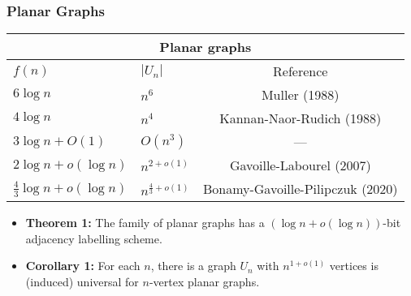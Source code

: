 \documentclass[xcolor=dvipsnames]{beamer}
\begin{document}
\begin{frame}
    \frametitle{Planar Graphs}
    \begin{center}
        \begin{tabular}{llc} \hline
            \multicolumn{3}{|c|}{Planar graphs} \\ \hline
            $f(n)$ & $|U_n|$ & Reference \\ %
            {$6\log n$} & $n^6$ & Muller (1988) \\ %
            {$4\log n$} & $n^4$ & Kannan-Naor-Rudich (1988) \\ %
            {$3\log n + O(1)$} & $O(n^3)$ & ---  \\ %
            {$2\log n + o(\log n)$} & $n^{2+o(1)}$ & Gavoille-Labourel (2007) \\ %
            {$\tfrac{4}{3}\log n + o(\log n)$} & $n^{\tfrac{4}{3}+o(1)}$ & Bonamy-Gavoille-Pilipczuk (2020) %
        \end{tabular}
    \end{center}
    \begin{itemize}
        \item<7-> {\textbf{Theorem 1:}} The family of planar graphs has a $(\log n + o(\log n))$-bit adjacency labelling scheme.

        \item<8-> \textbf{Corollary 1:} For each $n$, there is a graph $U_n$ with $n^{1+o(1)}$ vertices is (induced) universal for $n$-vertex planar graphs.
    \end{itemize}
\end{frame}
\end{document}
